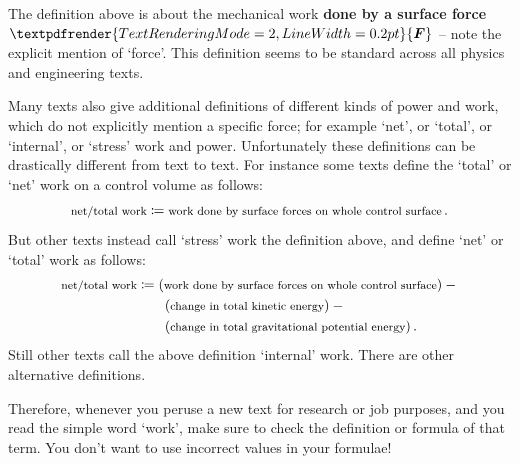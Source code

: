\documentclass[a4paper,12pt,%
onecolumn,oneside,%
british%
]{memoir}
\renewcommand*{\bm}[1]{\textpdfrender{TextRenderingMode=2,LineWidth=0.2pt}{\boldsymbol{#1}}}
\newcommand*{\defd}{\coloneqq}
\renewcommand*{\|}[1][]{\nonscript\:#1\vert\nonscript\:\mathopen{}}
\newcommand*{\yF}{\bm{F}}
\begin{document}
\begin{warning}
  The definition above is about the mechanical work \textbf{done by a surface force $\yF$} -- note the explicit mention of \enquote*{force}. This definition seems to be standard across all physics and engineering texts.

  \smallskip

  Many texts also give additional definitions of different kinds of power and work, which do not explicitly mention a specific force; for example \enquote*{net}, or \enquote*{total}, or \enquote*{internal}, or \enquote*{stress} work and power. Unfortunately these definitions can be drastically different from text to text. For instance some texts define the \enquote*{total} or \enquote*{net} work on a control volume as follows:
  \begin{equation*}
    \text{\footnotesize net/total work} \defd
    \text{\footnotesize work done by surface forces on whole control surface} \,.
  \end{equation*}
  But other texts instead call \enquote*{stress} work the definition above, and define \enquote*{net} or \enquote*{total} work as follows:
  \begin{multline*}
    \begin{aligned}
      \text{\footnotesize net/total work} &\defd
      (\text{\footnotesize work done by surface forces on whole control surface})
      -{}\\&\qquad
      (\text{\footnotesize change in total kinetic energy}) -{}\\&\qquad
      (\text{\footnotesize change in total gravitational potential energy}) \,.
    \end{aligned}
  \end{multline*}
  Still other texts call the above definition \enquote*{internal} work. There are other alternative definitions.

  \smallskip

  Therefore, whenever you peruse a new text for research or job purposes, and you read the simple word \enquote*{work}, make sure to check the definition or formula of that term. You don't want to use incorrect values in your formulae!
\end{warning}
\end{document}
